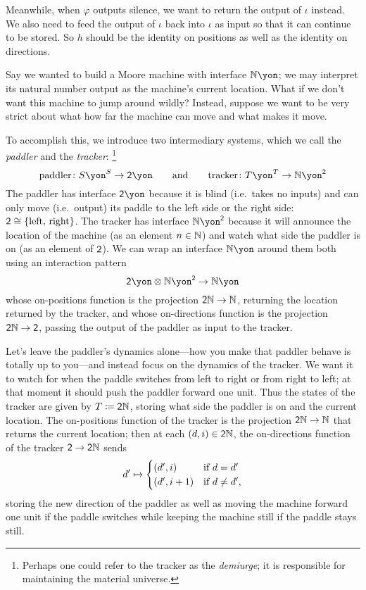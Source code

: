 \documentclass[Book-Poly]{subfiles}
\begin{document}
\begin{example}[Repeater]
Meanwhile, when $\varphi$ outputs silence, we want to return the output of $\iota$ instead.
We also need to feed the output of $\iota$ back into $\iota$ as input so that it can continue to be stored.
So $h$ should be the identity on positions as well as the identity on directions.
\end{example}

\begin{example}[Paddling]\label{ex.paddler}
Say we wanted to build a Moore machine with interface $\nn\yon$; we may interpret its natural number output as the machine's current location.
What if we don't want this machine to jump around wildly?
Instead, suppose we want to be very strict about what how far the machine can move and what makes it move.

To accomplish this, we introduce two intermediary systems, which we call the \emph{paddler} and the \emph{tracker}:%
\footnote{Perhaps one could refer to the tracker as the \emph{demiurge}; it is responsible for maintaining the material universe.}
\[
  \text{paddler}\colon S\yon^S\to\2\yon
  \qqand
  \text{tracker}\colon T\yon^T\to\nn\yon^\2
\]
The paddler has interface $\2\yon$ because it is blind (i.e.\ takes no inputs) and can only move (i.e.\ output) its paddle to the left side or the right side: $\textsf{2}\cong\{\text{left, right}\}$. The tracker has interface $\nn\yon^\2$ because it will announce the location of the machine (as an element $n\in\mathbb{N}$) and watch what side the paddler is on (as an element of $\textsf{2}$).
We can wrap an interface $\nn\yon$ around them both using an interaction pattern
\[
    \2\yon\otimes\nn\yon^\2\to\nn\yon
\]
whose on-positions function is the projection $\textsf{2}\mathbb{N}\to\mathbb{N}$, returning the location returned by the tracker, and whose on-directions function is the projection $\textsf{2}\mathbb{N}\to\textsf{2}$, passing the output of the paddler as input to the tracker.

Let's leave the paddler's dynamics alone---how you make that paddler behave is totally up to you---and instead focus on the dynamics of the tracker.
We want it to watch for when the paddle switches from left to right or from right to left; at that moment it should push the paddler forward one unit. Thus the states of the tracker are given by $T\coloneqq\textsf{2}\mathbb{N}$, storing what side the paddler is on and the current location.
The on-positions function of the tracker is the projection $\textsf{2}\mathbb{N}\to\mathbb{N}$ that returns the current location; then at each $(d,i)\in\textsf{2}\mathbb{N}$, the on-directions function of the tracker $\textsf{2}\to\textsf{2}\mathbb{N}$ sends
\[
  d'\mapsto
	\begin{cases}
		(d',i)&\textnormal{if }d=d'\\
		(d',i+1)&\textnormal{if }d\neq d',
	\end{cases}
\]
storing the new direction of the paddler as well as moving the machine forward one unit if the paddle switches while keeping the machine still if the paddle stays still.
\end{example}
\end{document}

